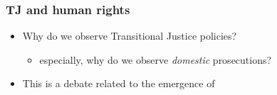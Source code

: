 \documentclass[aspectratio=43]{beamer}
\begin{document}







\begin{frame}
\frametitle{TJ and human rights}
\centering

\begin{itemize}
  \item Why do we observe Transitional Justice policies?
  \begin{itemize}
    \item especially, why do we observe \textit{domestic} prosecutions?
  \end{itemize}
  \item This is a debate related to the emergence of 
\end{itemize}

\end{frame}
\end{document}
